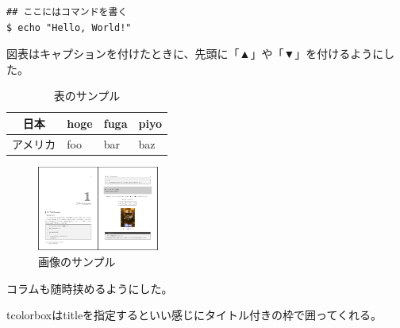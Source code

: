 \begin{shaded}
\begin{verbatim}
## ここにはコマンドを書く
$ echo "Hello, World!"
\end{verbatim}
\end{shaded}

図表はキャプションを付けたときに、先頭に「▲」や「▼」を付けるようにした。

\begin{table}[H]
  \centering
  \caption{表のサンプル}
  \begin{tabular}{|c|l|l|l|} \hline
    日本 & hoge & fuga & piyo \\ \hline
    アメリカ & foo & bar & baz \\ \hline
  \end{tabular}
  \label{table-sample0301}
\end{table}

\begin{figure}[H]
  \centering
  \includegraphics[width=4cm]{./image/03-Tech/chap1/sample.png}
  \caption{画像のサンプル}
  \label{figure-sample0301}
\end{figure}

\begin{tcolorbox}[title=これはコラム]
  コラムも随時挟めるようにした。

  tcolorboxはtitleを指定するといい感じにタイトル付きの枠で囲ってくれる。
\end{tcolorbox}